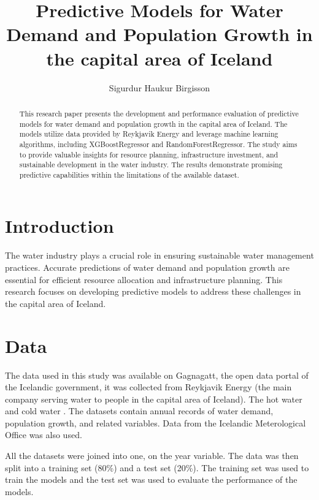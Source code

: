 \documentclass{article}
\begin{document}
\title{Predictive Models for Water Demand and Population Growth in the capital area of Iceland}
\author{Sigurdur Haukur Birgisson}

\maketitle

\begin{abstract}
    This research paper presents the development and performance evaluation of predictive models for water demand and population growth in the capital area of Iceland. The models utilize data provided by Reykjavik Energy and leverage machine learning algorithms, including XGBoostRegressor and RandomForestRegressor. The study aims to provide valuable insights for resource planning, infrastructure investment, and sustainable development in the water industry. The results demonstrate promising predictive capabilities within the limitations of the available dataset.
\end{abstract}

\tableofcontents
\newpage

\section{Introduction}
The water industry plays a crucial role in ensuring sustainable water management practices. Accurate predictions of water demand and population growth are essential for efficient resource allocation and infrastructure planning. This research focuses on developing predictive models to address these challenges in the capital area of Iceland.

\section{Data}
The data used in this study was available on Gagnagatt, the open data portal of the Icelandic government, it was collected from Reykjavik Energy (the main company serving water to people in the capital area of Iceland). The hot water \cite{hot-water} and cold water \cite{cold-water}. The datasets contain annual records of water demand, population growth, and related variables. Data from the Icelandic Meterological Office \cite{weather} was also used.

All the datasets were joined into one, on the year variable. The data was then split into a training set (80\%) and a test set (20\%). The training set was used to train the models and the test set was used to evaluate the performance of the models.
\end{document}
